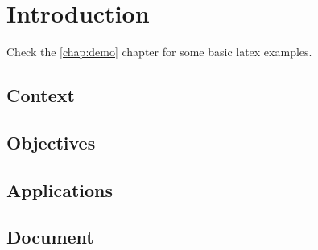\chapter{Introduction} \label{chap:introduction}


Check the \ref{chap:demo} chapter for some basic latex examples.

\section{Context} \label{sec:context}




\section{Objectives} \label{sec:objectives}




\section{Applications} \label{sec:applications}


\section{Document} \label{sec:document}
